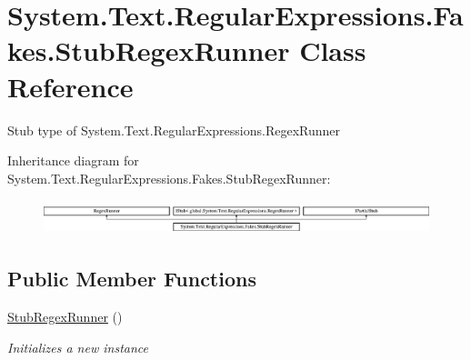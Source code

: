 \hypertarget{class_system_1_1_text_1_1_regular_expressions_1_1_fakes_1_1_stub_regex_runner}{\section{System.\-Text.\-Regular\-Expressions.\-Fakes.\-Stub\-Regex\-Runner Class Reference}
\label{class_system_1_1_text_1_1_regular_expressions_1_1_fakes_1_1_stub_regex_runner}
}


Stub type of System.\-Text.\-Regular\-Expressions.\-Regex\-Runner 


Inheritance diagram for System.\-Text.\-Regular\-Expressions.\-Fakes.\-Stub\-Regex\-Runner\-:\begin{figure}[H]
\begin{center}
\leavevmode
\includegraphics[height=1.000894cm]{class_system_1_1_text_1_1_regular_expressions_1_1_fakes_1_1_stub_regex_runner}
\end{center}
\end{figure}
\subsection*{Public Member Functions}
\begin{DoxyCompactItemize}
\item 
\hyperlink{class_system_1_1_text_1_1_regular_expressions_1_1_fakes_1_1_stub_regex_runner_a3e16fbffa6d9b08f8c2caf4f733c47b1}{Stub\-Regex\-Runner} ()
\begin{DoxyCompactList}\small\item\em Initializes a new instance\end{DoxyCompactList}\end{DoxyCompactItemize}
